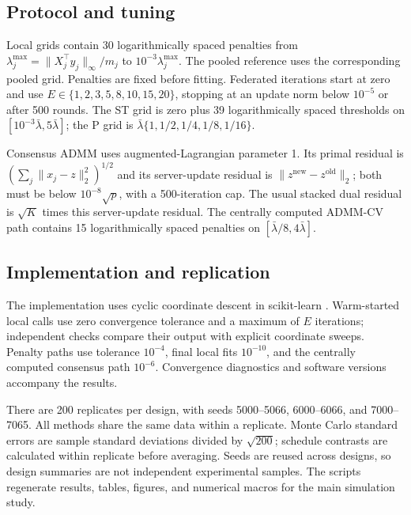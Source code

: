 \subsection{Protocol and tuning}

Local grids contain 30 logarithmically spaced penalties from
$\lambda_j^{\max}=\|X_j^\top y_j\|_\infty/m_j$ to
$10^{-3}\lambda_j^{\max}$. The pooled reference uses the corresponding
pooled grid. Penalties are fixed before fitting. Federated iterations
start at zero and use $E\in\{1,2,3,5,8,10,15,20\}$, stopping at an
update norm below $10^{-5}$ or after 500 rounds. The ST grid is zero
plus 39 logarithmically spaced thresholds on
$[10^{-3}\bar\lambda,5\bar\lambda]$; the P grid is
$\bar\lambda\{1,1/2,1/4,1/8,1/16\}$.

Consensus ADMM uses augmented-Lagrangian parameter 1. Its primal residual
is $(\sum_j\|x_j-z\|_2^2)^{1/2}$ and its server-update residual is
$\|z^{\mathrm{new}}-z^{\mathrm{old}}\|_2$; both must be below
$10^{-8}\sqrt p$, with a 500-iteration cap. The usual stacked dual
residual is $\sqrt K$ times this server-update residual. The centrally
computed ADMM-CV path contains 15 logarithmically spaced penalties on
$[\bar\lambda/8,4\bar\lambda]$.

\subsection{Implementation and replication}

The implementation uses cyclic coordinate descent in scikit-learn
\citep{pedregosa2011}. Warm-started local calls use zero convergence
tolerance and a maximum of $E$ iterations; independent checks compare
their output with explicit coordinate sweeps. Penalty paths use tolerance
$10^{-4}$, final local fits $10^{-10}$, and the centrally computed
consensus path $10^{-6}$. Convergence diagnostics and software versions
accompany the results.

There are 200 replicates per design, with seeds 5000--5066, 6000--6066,
and 7000--7065. All methods share the same data within a replicate.
Monte Carlo standard errors are sample standard deviations divided by
$\sqrt{200}$; schedule contrasts are calculated within replicate before
averaging. Seeds are reused across designs, so design summaries are not
independent experimental samples. The scripts regenerate results, tables,
figures, and numerical macros for the main simulation study.
